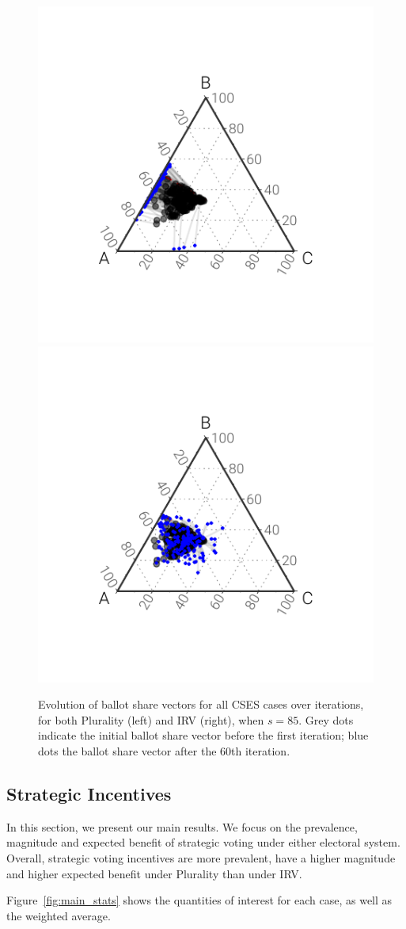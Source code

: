 \documentclass[12pt, letter]{article}
\begin{document}
\begin{figure}[]
	\centering
	\includegraphics[width = .49\textwidth]{../output/figures/tatonnement_plur}
	\includegraphics[width = .49\textwidth]{../output/figures/tatonnement_rcv}
	\caption{Evolution of ballot share vectors for all CSES cases over iterations, for both Plurality (left) and IRV (right), when $s = 85$. Grey dots indicate the initial ballot share vector before the first iteration; blue dots the ballot share vector after the 60th iteration.}
	\label{fig:convergence_paths}
\end{figure}

\subsection{Strategic Incentives}

In this section, we present our main results. We focus on the prevalence, magnitude and expected benefit of strategic voting under either electoral system. Overall, strategic voting incentives are more prevalent, have a higher magnitude and higher expected benefit under Plurality than under IRV.

Figure~\ref{fig:main_stats} shows the quantities of interest for each case, as well as the weighted average.
\end{document}
